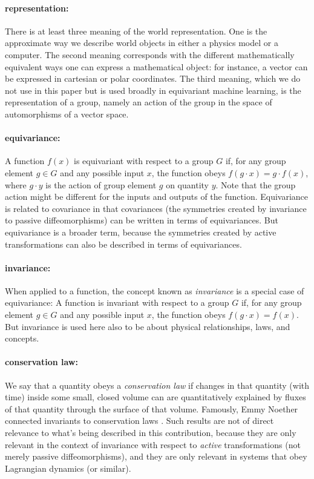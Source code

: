 \documentclass{article}
\begin{document}
\paragraph{representation:} There is at least three meaning of the world representation. One is the approximate way we describe world objects in either a physics model or a computer. The second meaning corresponds with the different mathematically equivalent ways one can express a mathematical object: for instance, a vector can be expressed in cartesian or polar coordinates. The third meaning, which we do not use in this paper but is used broadly in equivariant machine learning, is the representation of a group, namely an action of the group in the space of automorphisms of a vector space. 

\paragraph{equivariance:}
A function $f(x)$ is equivariant with respect to a group $G$ if, for any group element $g\in G$ and any possible input $x$, the function obeys $f(g\cdot x) = g\cdot f(x)$, where $g\cdot y$ is the action of group element $g$ on quantity $y$.
Note that the group action might be different for the inputs and outputs of the function.
Equivariance is related to covariance in that covariances (the symmetries created by invariance to passive diffeomorphisms) can be written in terms of equivariances.
But equivariance is a broader term, because the symmetries created by active transformations can also be described in terms of equivariances.

\paragraph{invariance:}
When applied to a function, the concept known as \emph{invariance} is a special case of equivariance:
A function is invariant with respect to a group $G$ if, for any group element $g\in G$ and any possible input $x$, the function obeys $f(g\cdot x) = f(x)$.
But invariance is used here also to be about physical relationships, laws, and concepts.

\paragraph{conservation law:}
We say that a quantity obeys a \emph{conservation law} if changes in that quantity (with time) inside some small, closed volume can are quantitatively explained by fluxes of that quantity through the surface of that volume.
Famously, Emmy Noether connected invariants to conservation laws \cite{noether}.
Such results are not of direct relevance to what's being described in this contribution, because they are only relevant in the context of invariance with respect to \emph{active} transformations (not merely passive diffeomorphisms), and they are only relevant in systems that obey Lagrangian dynamics (or similar).
\end{document}
